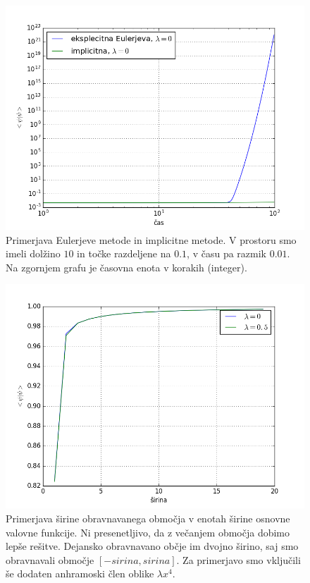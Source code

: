 \documentclass[slovene,11pt,a4paper]{article}
\numberwithin{equation}{section} %
\numberwithin{figure}{section} %
\numberwithin{table}{section} %
\begin{document}
\begin{figure}[h]
\label{slika1}
\begin{center}
\includegraphics[scale=0.45]{slike/primerjava1.png}
\end{center}
\caption{Primerjava Eulerjeve metode in implicitne metode. V prostoru smo imeli dolžino $10$ in točke razdeljene na $0.1$, v času pa razmik $0.01$. Na zgornjem grafu je časovna enota v korakih (integer).}
\end{figure}


\begin{figure}[h]
\label{slika1}
\begin{center}
\includegraphics[scale=0.45]{slike/slika2.png}
\end{center}
\caption{Primerjava širine obravnavanega območja v enotah širine osnovne valovne funkcije. Ni presenetljivo, da z večanjem območja dobimo lepše rešitve. Dejansko obravnavano občje im dvojno širino, saj smo obravnavali območje $[-sirina,sirina]$. Za primerjavo smo vključili še dodaten anhramoski člen oblike $\lambda x^4$.}
\end{figure}
\end{document}
